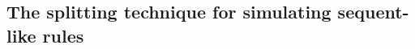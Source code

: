 \documentclass[UKenglish,acmsmall,authorversion]{acmart}
\theoremstyle{plain}
\begin{document}
{%
%
%
%
%





}{}
\subsection{The splitting technique for simulating sequent-like rules}
\end{document}
